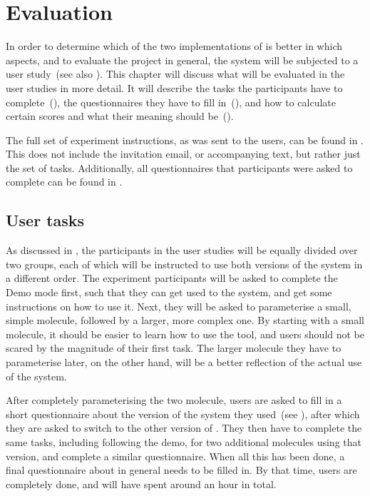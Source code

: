 \chapter{Evaluation}

In order to determine which of the two implementations of \oframp{} is better in which aspects, and to evaluate the project in general, the system will be subjected to a user study~(see also ). This chapter will discuss what will be evaluated in the user studies in more detail. It will describe the tasks the participants have to complete~(), the questionnaires they have to fill in~(), and how to calculate certain scores and what their meaning should be~().

The full set of experiment instructions, as was sent to the users, can be found in . This does not include the invitation email, or accompanying text, but rather just the set of tasks. Additionally, all questionnaires that participants were asked to complete can be found in .



\section{User tasks}
As discussed in , the participants in the user studies will be equally divided over two groups, each of which will be instructed to use both versions of the system in a different order. The experiment participants will be asked to complete the Demo mode first, such that they can get used to the system, and get some instructions on how to use it. Next, they will be asked to parameterise a small, simple molecule, followed by a larger, more complex one. By starting with a small molecule, it should be easier to learn how to use the tool, and users should not be scared by the magnitude of their first task. The larger molecule they have to parameterise later, on the other hand, will be a better reflection of the actual use of the system.

After completely parameterising the two molecule, users are asked to fill in a short questionnaire about the version of the system they used~(see ), after which they are asked to switch to the other version of \oframp. They then have to complete the same tasks, including following the demo, for two additional molecules using that version, and complete a similar questionnaire. When all this has been done, a final questionnaire about \oframp{} in general needs to be filled in. By that time, users are completely done, and will have spent around an hour in total.


